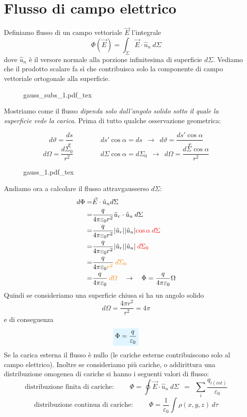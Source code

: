 \documentclass[x11names]{report}
\newcommand{\incfig}[1]{%
	{#1.pdf_tex}
}
\newcommand{\viola}[1]{%
	\colorbox{myblue}{$\displaystyle #1$}
}
\begin{document}
\section{Flusso di campo elettrico}
Definiamo flusso di un campo vettoriale \(\vec{E}\) l'integrale
\[
\Phi (\vec{E}) = \int_{\Sigma} \vec{E}\cdot \hat{u}_n \: d\Sigma
\]
dove \(\hat{u}_n\) è il versore normale alla porzione infinitesima di superficie \(d\Sigma\). Vediamo che il prodotto scalare fa sì che contribuisca solo la componente di campo vettoriale ortogonale alla superficie. 

\begin{figure}[h]
	\centering
	\incfig{gauss_subs_1}
\end{figure}

Mostriamo come il flusso \textit{dipenda solo dall'angolo solido sotto il quale la superficie vede la carica}. Prima di tutto qualche osservazione geometrica:

\[
d\vartheta = \frac{ds}{r} \qquad \qquad ds' \cos\alpha = ds \;\ \to \;\ d\vartheta = \frac{ds'\cos\alpha}{r}
\]
\[
d\Omega= \frac{d\Sigma_0}{r^2} \qquad \qquad d\Sigma \cos\alpha = d\Sigma_0 \;\ \to \;\ d\Omega = \frac{d\Sigma\cos\alpha}{r^2}
\]

\begin{figure}[h]
	\centering
	\incfig{gauss_1}
\end{figure}


Andiamo ora a calcolare il flusso attravgausserso \(d\Sigma\):
\begin{align*}
	d\Phi =& \vec{E} \cdot \hat{u}_n d\Sigma \\ 
		  =& \frac{q}{4\pi\varepsilon_0 r^2} \hat{u}_r \cdot \hat{u}_n \: d\Sigma \\
		  =& \frac{q}{4\pi\varepsilon_0 r^2} |\hat{u}_r||\hat{u}_n|\textcolor{red}{\cos\alpha\: d\Sigma} \\ 
		  =& \frac{q}{4\pi\varepsilon_0 r^2} |\hat{u}_r||\hat{u}_n|\textcolor{red}{\: d\Sigma_0} \\
		  =& \frac{q}{4\pi\varepsilon_0  \textcolor{orange}{r^2}} \textcolor{orange}{\: d\Sigma_0} \\
		  =& \frac{q}{4\pi\varepsilon_0}\: \textcolor{orange}{d\Omega} \quad \to \quad \Phi = \frac{q}{4\pi\varepsilon_0}\Omega
\end{align*}
Quindi se consideriamo una superficie chiusa si ha un angolo solido 
\[
d\Omega = \frac{4\pi r^2}{r^2} = 4\pi
\]
e di conseguenza
\begin{equation}
	\viola{\Phi = \frac{q}{\varepsilon_0}}
\end{equation}
Se la carica esterna il flusso è nullo (le cariche esterne contribuiscono solo al campo elettrico). Inoltre se consideriamo più cariche, o addirittura una distribuzione omogenea di cariche si hanno i seguenti valori di flusso:
\[
\text{distribuzione finita di cariche: }\qquad \Phi = \oint \vec{E} \cdot \hat{u}_n \: d\Sigma \;\ = \;\ \sum_i \frac{q_{i(int)}}{\varepsilon_0}
\]
\[
\text{distribuzione continua di cariche: }\qquad \Phi = \frac{1}{\varepsilon_0}\int \rho(x,y,z) \:d\tau 
\]
\end{document}
